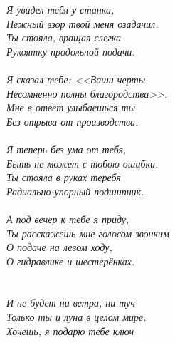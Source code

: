 \vspace{1.0cm}
\noindent\textit{%
\hspace*{2.7cm}Я увидел тебя у станка,\\
\hspace*{2.7cm}Нежный взор твой меня озадачил.\\
\hspace*{2.7cm}Ты стояла, вращая слегка\\
\hspace*{2.7cm}Рукоятку продольной подачи.\\
\\
\hspace*{2.7cm}Я сказал тебе: <<Ваши черты\\
\hspace*{2.7cm}Несомненно полны благородства>>.\\
\hspace*{2.7cm}Мне в ответ улыбаешься ты\\
\hspace*{2.7cm}Без отрыва от производства.\\
\\
\hspace*{2.7cm}Я теперь без ума от тебя,\\
\hspace*{2.7cm}Быть не может с тобою ошибки.\\
\hspace*{2.7cm}Ты стояла в руках теребя\\
\hspace*{2.7cm}Радиально-упорный подшипник.\\
\\
\hspace*{2.7cm}А под вечер к тебе я приду,\\
\hspace*{2.7cm}Ты расскажешь мне голосом звонким\\
\hspace*{2.7cm}О подаче на левом ходу,\\
\hspace*{2.7cm}О гидравлике и шестерёнках.\\
\\
\\
\hspace*{2.7cm}И не будет ни ветра, ни туч\mdash\\
\hspace*{2.7cm}Только ты и луна в целом мире.\\
\hspace*{2.7cm}Хочешь, я подарю тебе ключ\\
}
